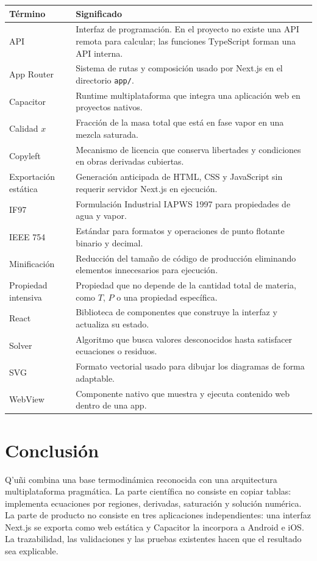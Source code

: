 \documentclass[11pt,a4paper,oneside]{article}
\newcommand{\app}{Q'u\~ni}
\newcommand{\code}[1]{\texttt{#1}}
\begin{document}
\begin{longtable}{p{3.35cm}p{10.55cm}}
\toprule
T\'ermino & Significado \\
\midrule
\endhead
API & Interfaz de programaci\'on. En el proyecto no existe una API remota para calcular; las funciones TypeScript forman una API interna. \\
App Router & Sistema de rutas y composici\'on usado por Next.js en el directorio \code{app/}. \\
Capacitor & Runtime multiplataforma que integra una aplicaci\'on web en proyectos nativos. \\
Calidad $x$ & Fracci\'on de la masa total que est\'a en fase vapor en una mezcla saturada. \\
Copyleft & Mecanismo de licencia que conserva libertades y condiciones en obras derivadas cubiertas. \\
Exportaci\'on est\'atica & Generaci\'on anticipada de HTML, CSS y JavaScript sin requerir servidor Next.js en ejecuci\'on. \\
IF97 & Formulaci\'on Industrial IAPWS 1997 para propiedades de agua y vapor. \\
IEEE 754 & Est\'andar para formatos y operaciones de punto flotante binario y decimal. \\
Minificaci\'on & Reducci\'on del tama\~no de c\'odigo de producci\'on eliminando elementos innecesarios para ejecuci\'on. \\
Propiedad intensiva & Propiedad que no depende de la cantidad total de materia, como $T$, $P$ o una propiedad espec\'ifica. \\
React & Biblioteca de componentes que construye la interfaz y actualiza su estado. \\
Solver & Algoritmo que busca valores desconocidos hasta satisfacer ecuaciones o residuos. \\
SVG & Formato vectorial usado para dibujar los diagramas de forma adaptable. \\
WebView & Componente nativo que muestra y ejecuta contenido web dentro de una app. \\
\bottomrule
\end{longtable}

\section{Conclusi\'on}

\app{} combina una base termodin\'amica reconocida con una arquitectura multiplataforma pragm\'atica. La parte cient\'ifica no consiste en copiar tablas: implementa ecuaciones por regiones, derivadas, saturaci\'on y soluci\'on num\'erica. La parte de producto no consiste en tres aplicaciones independientes: una interfaz Next.js se exporta como web est\'atica y Capacitor la incorpora a Android e iOS. La trazabilidad, las validaciones y las pruebas existentes hacen que el resultado sea explicable.
\end{document}

